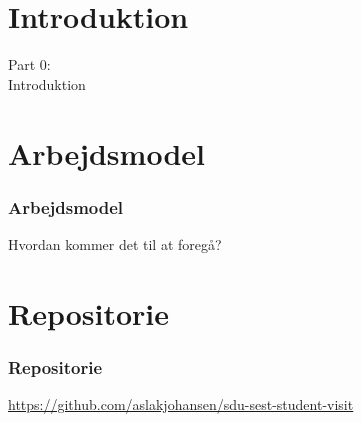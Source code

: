 \section{Introduktion}
\begin{frame}
  \vspace{25mm}
  \begin{center}
    \Huge{Part 0:\\Introduktion}
  \end{center}
\end{frame}

\section{Arbejdsmodel}
\begin{frame}
  \frametitle{Arbejdsmodel}
  Hvordan kommer det til at foregå?
\end{frame}

\section{Repositorie}
\begin{frame}
    \frametitle{Repositorie}
    \begin{center}
      \url{https://github.com/aslakjohansen/sdu-sest-student-visit}
    \end{center}
\end{frame}



